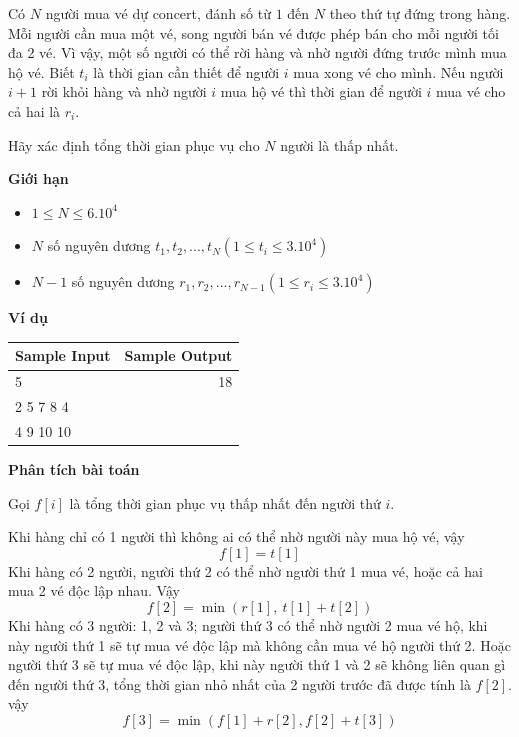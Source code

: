 \documentclass{article}
\begin{document}
\begin{tcolorbox}[
    colback=blue!5,        %
    colframe=blue!75!black,%
    title={Đề bài}
]
Có $N$ người mua vé dự concert, đánh số từ $1$ đến $N$ theo thứ tự đứng trong hàng. Mỗi người cần mua một vé, song người bán vé được phép bán cho mỗi người tối đa 2 vé. Vì vậy, một số người có thể rời hàng và nhờ người đứng trước mình mua hộ vé. Biết $t_i$ là thời gian cần thiết để người $i$ mua xong vé cho mình. Nếu người $i + 1$ rời khỏi hàng và nhờ người $i$ mua hộ vé thì thời gian để người $i$ mua vé cho cả hai là $r_i$.

\vspace{0.25cm}
Hãy xác định tổng thời gian phục vụ cho $N$ người là thấp nhất.
\end{tcolorbox}

\textbf{Giới hạn}
\begin{itemize}
    \item $1 \leq N \leq 6.10^4$
    \item $N$ số nguyên dương $t_1, t_2,..., t_N (1 \leq t_i \leq 3.10^4)$
    \item $N - 1$ số nguyên dương $r_1, r_2,..., r_{N-1} (1 \leq r_i \leq 3.10^4)$
\end{itemize}

\textbf{Ví dụ}

\begin{table}[h]
    \centering
    \begin{tabular}{|l|r|}
        \hline
        \textbf{Sample Input} & \textbf{Sample Output} \\
        \hline
		5& 18\\ 
		2 5 7 8 4&  \\
          4 9 10 10& \\ 
		\hline
    \end{tabular}
\end{table}

\textbf{Phân tích bài toán}

Gọi \( f[i] \) là tổng thời gian phục vụ thấp nhất đến người thứ $i$.

\vspace{1em}

Khi hàng chỉ có 1 người thì không ai có thể nhờ người này mua hộ vé, vậy 
\[
    f[1] = t[1]
\]
Khi hàng có 2 người, người thứ 2 có thể nhờ người thứ 1 mua vé, hoặc cả hai mua 2 vé độc lập nhau. Vậy 
\[
    f[2] = \min \left( r[1],\ t[1] + t[2] \right)
\]
Khi hàng có 3 người: 1, 2 và 3; người thứ 3 có thể nhờ người 2 mua vé hộ, khi này người thứ 1 sẽ tự mua vé độc lập mà không cần mua vé hộ người thứ 2. Hoặc người thứ 3 sẽ tự mua vé độc lập, khi này người thứ 1 và 2 sẽ không liên quan gì đến người thứ 3, tổng thời gian nhỏ nhất của 2 người trước đã được tính là \(f[2]\). vậy
\[
    f[3] = \min \left( f[1] + r[2], f[2] + t[3]  \right)
\]
\end{document}
